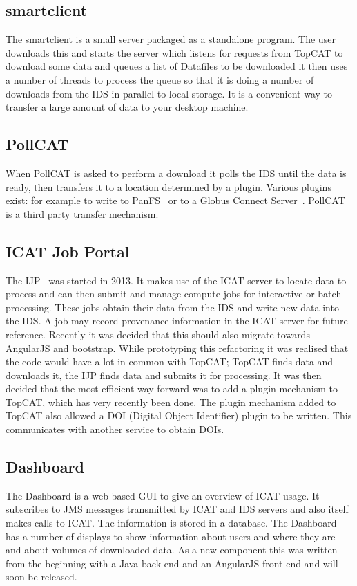 \documentclass[a4paper]{jpconf}
\begin{document}
\subsection{smartclient}
The smartclient is a small server packaged as a standalone
program. The user downloads this and starts the server which listens
for requests from TopCAT to download some data and queues a list of
Datafiles to be downloaded it then uses a number of threads to process
the queue so that it is doing a number of downloads from the IDS in
parallel to local storage. It is a convenient way to transfer a large
amount of data to your desktop machine.

\subsection{PollCAT}
When PollCAT is asked to perform a download it polls the IDS until
the data is ready, then transfers it to a location determined by a
plugin. Various plugins exist: for example to write to
PanFS~\cite{ref:panfs} or to a Globus Connect
Server~\cite{ref:globus_connect_server}. PollCAT is a third party
transfer mechanism.

\subsection{ICAT Job Portal}
The IJP~\cite{ref:ijp} was started in 2013. It makes use of the ICAT
server to locate data to process and can then submit and manage
compute jobs for interactive or batch processing. These jobs obtain
their data from the IDS and write new data into the IDS. A job may
record provenance information in the ICAT server for future
reference. Recently it was decided that this should also migrate
towards AngularJS and bootstrap. While prototyping this refactoring it
was realised that the code would have a lot in common with TopCAT;
TopCAT finds data and downloads it, the IJP finds data and submits it
for processing. It was then decided that the most efficient way
forward was to add a plugin mechanism to TopCAT, which has very
recently been done. The plugin mechanism added to TopCAT also allowed
a DOI (Digital Object Identifier) plugin to be written. This
communicates with another service to obtain DOIs.

\subsection{Dashboard}
The Dashboard is a web based GUI to give an overview of ICAT usage. It
subscribes to JMS messages transmitted by ICAT and IDS servers and
also itself makes calls to ICAT. The information is stored in a
database. The Dashboard has a number of displays to show information
about users and where they are and about volumes of downloaded
data. As a new component this was written from the beginning with a
Java back end and an AngularJS front end and will soon be released.
\end{document}

